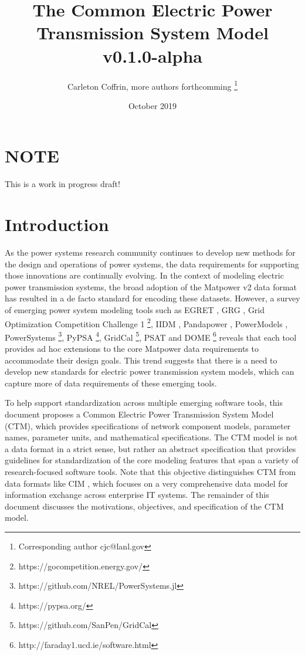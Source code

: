 \documentclass{article}
\title{The Common Electric Power Transmission System Model \\ v0.1.0-alpha}
\author{Carleton Coffrin, more authors forthcomming \footnote{Corresponding author cjc@lanl.gov}}
\date{October 2019}
\newcommand{\matpower}[0]{{\sc Matpower}}
\begin{document}
\maketitle

{\color{red} 
\section{NOTE}
%
This is a work in progress draft!
}

\section{Introduction}
%
As the power systems research community continues to develop new methods for the design and operations of power systems, the data requirements for supporting those innovations are continually evolving.
In the context of modeling electric power transmission systems, the broad adoption of the \matpower{} v2 data format \cite{Zimmerman2011} has resulted in a de facto standard for encoding these datasets.  However, a survey of emerging power system modeling tools such as EGRET \cite{}, GRG \cite{}, Grid Optimization Competition Challenge 1 \footnote{https://gocompetition.energy.gov/}, IIDM \cite{}, Pandapower \cite{Meinecke2018}, PowerModels \cite{Coffrin2017},  PowerSystems \footnote{https://github.com/NREL/PowerSystems.jl}, PyPSA \footnote{https://pypsa.org/}, GridCal \footnote{https://github.com/SanPen/GridCal}, PSAT and DOME \footnote{http://faraday1.ucd.ie/software.html} reveals that each tool provides ad hoc extensions to the core \matpower{} data requirements to accommodate their design goals.  This trend suggests that there is a need to develop new standards for electric power transmission system models, which can capture more of data requirements of these emerging tools.

To help support standardization across multiple emerging software tools, this document proposes a Common Electric Power Transmission System Model (CTM), which provides specifications of network component models, parameter names, parameter units, and mathematical specifications.  The CTM model is not a data format in a strict sense, but rather an abstract specification that provides guidelines for standardization of the core modeling features that span a variety of research-focused software tools.  Note that this objective distinguishes CTM from data formats like CIM \cite{}, which focuses on a very comprehensive data model for information exchange across enterprise IT systems.  The remainder of this document discusses the motivations, objectives, and specification of the CTM model. 
\end{document}
